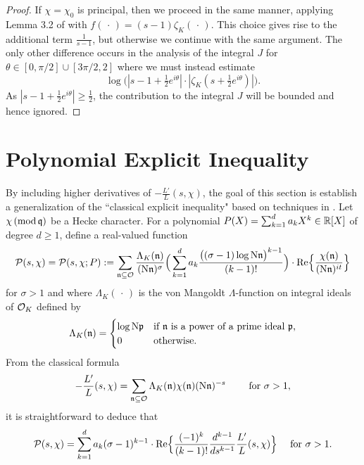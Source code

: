 \documentclass[12pt,psamsfonts]{amsart}
\theoremstyle{definition}
\theoremstyle{remark}
\numberwithin{equation}{section}
\begin{document}
\begin{proof}
If $\chi = \chi_0$ is principal, then we  proceed in the same manner, applying Lemma 3.2 of \cite{HBLinnik} with $f(\,\cdot\,) = (s-1)\zeta_K(\, \cdot \,)$. This choice gives rise to the additional term $\frac{1}{s-1}$, but otherwise we continue with the same argument. The only other difference occurs in the analysis of the integral $J$ for $\theta \in [0,\pi/2] \cup [3\pi/2, 2]$ where we must instead estimate
\[
\log\big( |s-1 +\tfrac{1}{2}e^{i\theta}| \cdot |\zeta_K(s+\tfrac{1}{2}e^{i\theta})| \big). 
\]
As  $|s-1+\tfrac{1}{2}e^{i\theta}| \geq \tfrac{1}{2}$, the contribution to the integral $J$ will be bounded and hence ignored. 
\end{proof}
\section{Polynomial Explicit Inequality}
\label{PolynomialEXP}
By including higher derivatives of $-\tfrac{L'}{L}(s,\chi)$, the goal of this section is establish a generalization of the ``classical explicit inequality"  based on techniques in \cite[Section 4]{HBLinnik}.   Let $\chi \, (\mathrm{mod} {\, \mathfrak{q}})$ be a Hecke character. For a polynomial $P(X) = \sum_{k=1}^d a_k X^k \in \mathbb{R}[X]$ of degree $d \geq 1$,  define a real-valued function
\begin{equation}
\mathcal{P}(s,\chi) = \mathcal{P}(s,\chi; P)  := \sum_{\mathfrak{n} \subseteq \mathcal{O}} \frac{\Lambda_K(\mathfrak{n})}{(\mathrm{N}\mathfrak{n})^\sigma} \Big( \sum_{k=1}^d a_k \frac{\big( (\sigma-1) \log \mathrm{N}\mathfrak{n}\big)^{k-1}}{(k-1)!} \Big) \cdot \mathrm{Re}\Big\{ \frac{\chi(\mathfrak{n})}{(\mathrm{N}\mathfrak{n})^{it} } \Big\}
\label{PolyAction-Trig}
\end{equation}
for $\sigma > 1$ and where $\Lambda_K(\,\cdot\,)$ is the von Mangoldt $\Lambda$-function on integral ideals of $\mathcal{O}_K$ defined by
\[
\Lambda_K(\mathfrak{n}) = \begin{cases} \log \mathrm{N}\mathfrak{p} & \text{if $\mathfrak{n}$ is a power of a prime ideal $\mathfrak{p}$,} \\ 0 & \text{otherwise}. \end{cases}
\]
From the classical formula
\[
-\frac{L'}{L}(s,\chi) = \sum_{\mathfrak{n} \subseteq \mathcal{O}} \Lambda_K(\mathfrak{n}) \chi(\mathfrak{n}) (\mathrm{N}\mathfrak{n})^{-s} \qquad \text{ for } \sigma > 1,
\]
it is straightforward to deduce that
\begin{equation}
\begin{aligned}
\mathcal{P}(s,\chi) 
& =\sum_{k=1}^d a_k (\sigma-1)^{k-1} \cdot \mathrm{Re}\Big\{  \frac{ (-1)^k}{(k-1)!} \frac{d^{k-1}}{ds^{k-1}} \frac{L'}{L}(s,\chi)  \Big\}  & \text{ for $\sigma > 1$}.\\
\end{aligned}
\label{PolyAction}
\end{equation}
\end{document}
